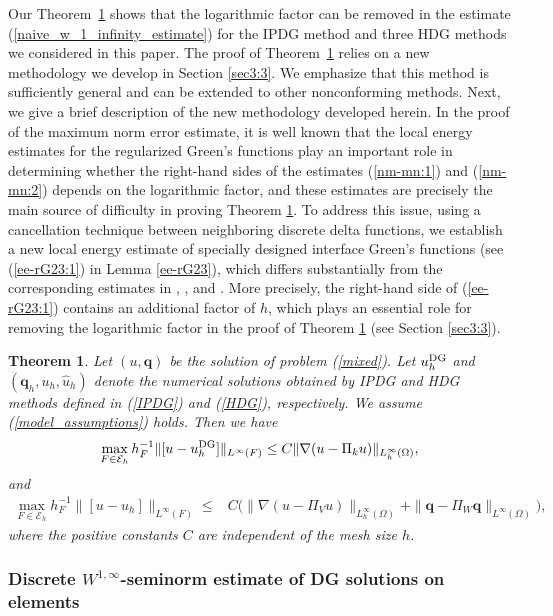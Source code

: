 \documentclass[1996/10/24]{amsart}
\newtheorem{theorem}{Theorem}[section]
\theoremstyle{definition}
\numberwithin{equation}{section}
\begin{document}
Our Theorem~\ref{mn-jump} shows that the logarithmic factor can be removed in the estimate (\ref{naive_w_1_infinity_estimate})
for the IPDG method and three HDG methods we considered in this paper. The proof of Theorem~\ref{mn-jump} relies on a new
methodology we develop in Section \ref{sec3:3}. We emphasize that this method is sufficiently general and can be extended
to other nonconforming methods. Next, we give a brief description of the new methodology developed herein. In the proof of
the maximum norm error estimate, it is well known that the local energy estimates for the regularized
Green's functions play an important role in determining whether the right-hand sides of the estimates (\ref{nm-mn:1}) and
(\ref{nm-mn:2}) depends on the logarithmic factor, and these estimates are precisely the main source of difficulty in proving Theorem \ref{mn-jump}. To address this issue, using a cancellation technique between neighboring discrete delta functions, we establish a new local energy estimate
of specially designed interface Green's functions (see (\ref{ee-rG23:1}) in Lemma \ref{ee-rG23}), which differs substantially from the corresponding estimates in \cite[Lemma 4.3]{cc2005}, \cite[(4.10)]{dlsw2012}, and \cite[Lemma 3.7]{lc2026}. More precisely, the right-hand side of (\ref{ee-rG23:1}) contains an
additional factor of $h$, which plays an essential role for removing the logarithmic factor in the proof of Theorem \ref{mn-jump} (see Section \ref{sec3:3}).


\begin{theorem}\label{mn-jump}
Let $(u,{\bm q})$ be the solution of problem (\ref{mixed}). Let $u_h^{{\rm DG}}$ and $({\bm q}_h,u_h,\widehat{u}_h)$ denote the
numerical solutions obtained by IPDG and HDG methods defined in (\ref{IPDG}) and (\ref{HDG}), respectively. We assume (\ref{model_assumptions})
holds. Then we have
\begin{align}
\max_{F\in\mathcal{E}_h}h_F^{-1}\|[u-u_h^{{\rm DG}}]\|_{L^{\infty}(F)}\leq C\|\nabla(u-\Pi_ku)\|_{L_h^{\infty}(\Omega)},\label{mn-jump:1}
\end{align}
and
\begin{align}
\max_{F\in\mathcal{E}_h}h_F^{-1}\|[u-u_h]\|_{L^{\infty}(F)}\leq& C\Big(\|\nabla(u-\Pi_Vu)\|_{L_h^{\infty}(\Omega)}
+\|{\bm q}-\Pi_W{\bm q}\|_{L^{\infty}(\Omega)}\Big),\label{mn-jump:2}
\end{align}
where the positive constants $C$ are independent of the mesh size $h$.
\end{theorem}

\subsubsection{Discrete $W^{1,\infty}$-seminorm estimate of DG solutions on elements}
\end{document}
